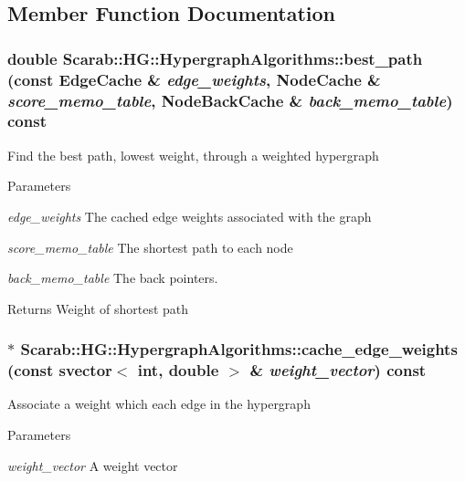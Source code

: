 \subsection{Member Function Documentation}
\hypertarget{classScarab_1_1HG_1_1HypergraphAlgorithms_aa9a28bf42d17a166ec5e780067e33259}{
\subsubsection[{best\_\-path}]{\setlength{\rightskip}{0pt plus 5cm}double Scarab::HG::HypergraphAlgorithms::best\_\-path (const {\bf EdgeCache} \& {\em edge\_\-weights}, \/  {\bf NodeCache} \& {\em score\_\-memo\_\-table}, \/  {\bf NodeBackCache} \& {\em back\_\-memo\_\-table}) const}}
\label{classScarab_1_1HG_1_1HypergraphAlgorithms_aa9a28bf42d17a166ec5e780067e33259}
Find the best path, lowest weight, through a weighted hypergraph 
\begin{DoxyParams}{Parameters}
\item[{\em edge\_\-weights}]The cached edge weights associated with the graph \item[{\em score\_\-memo\_\-table}]The shortest path to each node \item[{\em back\_\-memo\_\-table}]The back pointers. \end{DoxyParams}
\begin{DoxyReturn}{Returns}
Weight of shortest path 
\end{DoxyReturn}
\hypertarget{classScarab_1_1HG_1_1HypergraphAlgorithms_a28f83d7616f6153ca7c909fe82c5b0fa}{
\subsubsection[{cache\_\-edge\_\-weights}]{ $\ast$ Scarab::HG::HypergraphAlgorithms::cache\_\-edge\_\-weights (const {\bf svector}$<$ int, double $>$ \& {\em weight\_\-vector}) const}}
\label{classScarab_1_1HG_1_1HypergraphAlgorithms_a28f83d7616f6153ca7c909fe82c5b0fa}
Associate a weight which each edge in the hypergraph 
\begin{DoxyParams}{Parameters}
\item[{\em weight\_\-vector}]A weight vector \end{DoxyParams}
